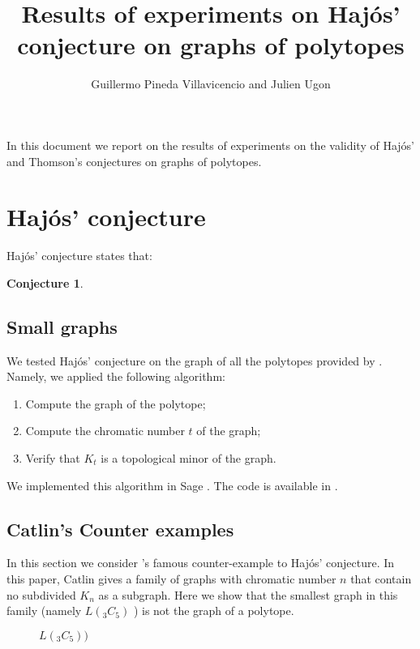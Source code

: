 \documentclass[a4paper,12pt]{article}
\title{Results of experiments on Haj\'os' conjecture on graphs of polytopes}
\author{Guillermo Pineda Villavicencio and Julien Ugon}
\newtheorem{conjecture}{Conjecture}
\begin{document}
  \maketitle

  In this document we report on the results of experiments on the validity of Haj\'os' and Thomson's conjectures on graphs of polytopes.

  \section{Haj\'os' conjecture}
  Haj\'os' conjecture states that:

  \begin{conjecture}
  \end{conjecture}


  \subsection{Small  graphs}

  We tested Haj\'os' conjecture on the graph of all the polytopes provided by \textcite{matroids}. Namely, we  applied the following  algorithm:

  \begin{enumerate}
    \item Compute the  graph of the polytope;
    \item Compute the chromatic number \(t\) of the graph;
    \item Verify  that \(K_t\) is a topological minor of the graph.
  \end{enumerate}

  We implemented this algorithm in Sage \parencite{SteinJoyner2005}. The code is available in \parencite{repo}.

  \subsection{Catlin's Counter examples}

  In this section we consider  \textcite{catlin1979hajos}'s famous counter-example to Haj\'os' conjecture. In this paper, Catlin gives a family of graphs with chromatic number  \(n\) that contain no  subdivided \(K_n\) as a  subgraph. Here we show that the smallest graph in this family (namely \(L(_3C_5)\) ) is not the  graph of a polytope.

  \begin{figure}
  
  \caption{\(L(_3C_5))\)}
  \label{fig:L3C5}
  \end{figure}
\end{document}
